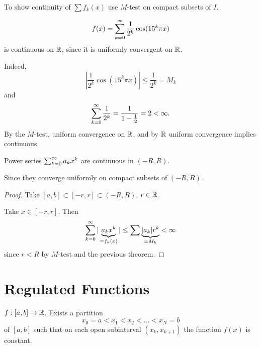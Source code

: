 \documentclass[10pt, a4paper]{article}
\begin{document}
To show continuity of $\sum f_k(x)$ use $M$-test on compact subsets of $I$.

\begin{example}
    \[
    f(x) = \sum_{k = 0}^{\infty}\frac{1}{2 ^ k}\cos(15 ^ k\pi x)
    \]
    is continuous on $\mathbb{R}$,
    since it is uniformly convergent on $\mathbb{R}$.

    \begin{solution}
        Indeed,
        \[
        \left|\frac{1}{2 ^ k}\cos(15 ^ k\pi x)\right| \leq \frac{1}{2 ^ k} = M_k
        \]
        and
        \[
        \sum_{k = 0}^{\infty}\frac{1}{2 ^ k} = \frac{1}{1 - \frac{1}{2}} = 2 < \infty.
        \]
        By the $M$-test,
        uniform convergence on $\mathbb{R}$,
        and by $\mathbb{R}$ uniform convergence implies continuous.
    \end{solution}
\end{example}

\begin{theorem}
    Power series $\sum_{k = 0}^{\infty} a_kx ^ k$ are continuous in $(-R, R)$.

    Since they converge uniformly on compact subsets of $(-R, R)$.

    \begin{proof}
        Take $[a, b] \subset [-r, r] \subset (-R, R)$,
        $r \in \mathbb{R}$.

        Take $x \in [-r, r]$.
        Then
        \[
        \sum_{k = 0}^{\infty}|\underbrace{a_kx ^ k}_{= f_k(x)}| \leq \sum\underbrace{|a_k|r ^ k}_{= M_k} < \infty
        \]
        since $r < R$ by $M$-test and the previous theorem.
    \end{proof}
\end{theorem}

\newpage

\section{Regulated Functions}

\begin{definition}
    $f : [a, b] \to \mathbb{R}$.
    Exists a partition
    \[
    x_0 = a < x_1 < x_2 < \dotsc < x_N = b
    \]
    of $[a, b]$ such that on each open subinterval $(x_k, x_{k + 1})$ the function $f(x)$ is constant.
\end{definition}
\end{document}
